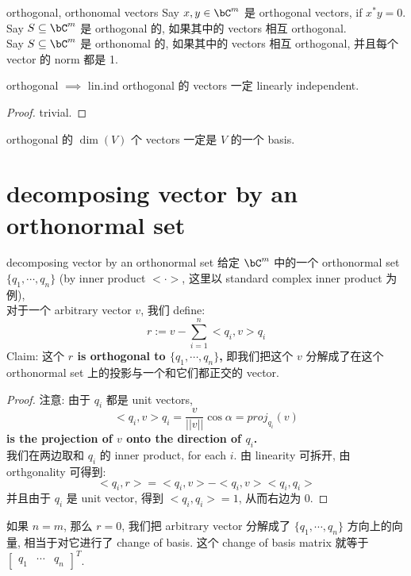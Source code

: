 \begin{definition}{orthogonal, orthonomal vectors}
    Say $x, y \in \bC^m$ 是 orthogonal vectors, if $x^* y = 0$.\\
    Say $S \sub \bC^m$ 是 orthogonal 的, 如果其中的 vectors 相互 orthogonal.\\
    Say $S \sub \bC^m$ 是 orthonomal 的, 如果其中的 vectors 相互 orthogonal, 并且每个 vector 的 norm 都是 1.
\end{definition}

\begin{theorem}{orthogonal $\implies$ lin.ind}
    orthogonal 的 vectors 一定 linearly independent.
\end{theorem}
\begin{proof}
    trivial.
\end{proof}
\begin{corollary}
    orthogonal 的 $\dim(V)$ 个 vectors 一定是 $V$ 的一个 basis.
\end{corollary}


\section{decomposing vector by an orthonormal set}
\begin{theorem}{decomposing vector by an orthonormal set}
给定 $\bC^m$ 中的一个 orthonormal set $\{q_1, \cdots, q_n\}$ (by inner product $<\cdot>$, 这里以 standard complex inner product 为例), 
\\对于一个 arbitrary vector $v$, 我们 define:
$$
r:= v - \sum_{i=1}^n <q_i, v>   q_i
$$
Claim: 这个 \textbf{$r$ is orthogonal to $\{q_1, \cdots, q_n\}$,} 即我们把这个 $v$ 分解成了在这个 orthonormal set 上的投影与一个和它们都正交的 vector.
\end{theorem}
\begin{proof}
    注意: 由于 $q_i$ 都是 unit vectors, $$<q_i, v> q_i = \frac{v}{||v||} \cos \alpha = proj_{q_i}(v)$$\textbf{ is the projection of $v$ onto the direction of $q_i$.}\\
我们在两边取和 $q_i$ 的 inner product, for each $i$. 由 linearity 可拆开, 由 orthgonality 可得到:
$$
<q_i,r> = <q_i,v> - <q_i,v><q_i,q_i>
$$
并且由于 $q_i$ 是 unit vector, 得到 $<q_i,q_i>=1$, 从而右边为 0.
\end{proof}
\begin{remark}
    如果 $n=m$, 那么 $r=0$, 我们把 arbitrary vector 分解成了 $\{q_1, \cdots, q_n\}$ 方向上的向量, 相当于对它进行了 change of basis. 这个 change of basis matrix 就等于 $\begin{bmatrix} q_1  & \cdots  & q_n \end{bmatrix}^T$.
\end{remark}


